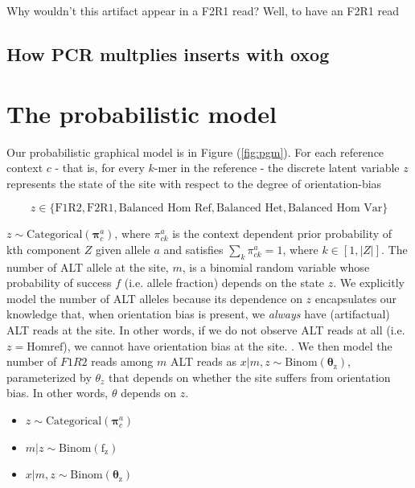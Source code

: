 \documentclass[a4paper]{article}
\newcommand{\vpi}{{\bm \pi}}
\newcommand{\vtheta}{{\bm \theta}}
\begin{document}
Why wouldn't this artifact appear in a F2R1 read? Well, to have an F2R1 read

\subsection{How PCR multplies inserts with oxog}


\section{The probabilistic model}

Our probabilistic graphical model is in Figure (\ref{fig:pgm}). For each reference context $c$ - that is, for every $k$-mer in the reference - the discrete latent variable $z$ represents the state of the site with respect to the degree of orientation-bias 

\begin{equation*}
z \in \{ \text{F1R2}, \text{F2R1}, \text{Balanced Hom Ref}, \text{Balanced Het}, \text{Balanced Hom Var} \}
\end{equation*}

$z \sim \mathrm{Categorical}(\vpi^a_c)$, where $\pi^a_{ck}$ is the context dependent prior probability of kth component $Z$ given allele $a$ and satisfies $\sum_k \pi^a_{ck} = 1$, where $k \in [1, |Z|]$. The number of ALT allele at the site, $m$, is a binomial random variable whose probability of success $f$ (i.e. allele fraction) depends on the state $z$. We explicitly model the number of ALT alleles because its dependence on $z$ encapsulates our knowledge that, when orientation bias is present, we \textit{always} have (artifactual) ALT reads at the site. In other words, if we do not observe ALT reads at all (i.e. $z = \mathrm{Hom ref}$), we cannot have orientation bias at the site. . We then model the number of $F1R2$ reads among $m$ ALT reads as $x|m,z \sim \mathrm{Binom(\vtheta_z)}$, parameterized by $\theta_z$ that depends on whether the site suffers from orientation bias. In other words, $\theta$ depends on $z$. 

\begin{itemize}
\item $z \sim \mathrm{Categorical}(\vpi^a_c)$
\item $m | z \sim \mathrm{Binom(f_z)}$
\item $x | m,z \sim \mathrm{Binom(\vtheta_z)}$
\end{itemize}
\end{document}
